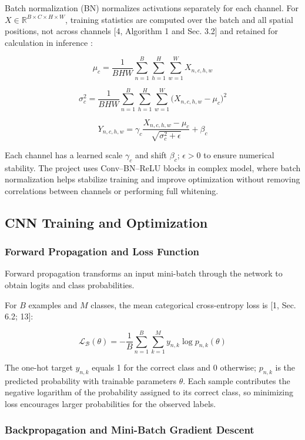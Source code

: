 Batch normalization (BN) normalizes activations separately for each channel. For \(X\in {\mathbb{R}}^{B\times C\times H\times W}\), training statistics are computed over the batch and all spatial positions, not across channels [4, Algorithm 1 and Sec. 3.2] and retained for calculation in inference :

\[
{\mu }_{c}=\frac{1}{BHW}\sum _{n=1}^{B} \sum _{h=1}^{H} \sum _{w=1}^{W} {X}_{n,c,h,w}
\]

\[
{\sigma }_{c}^{2}=\frac{1}{BHW}\sum _{n=1}^{B} \sum _{h=1}^{H} \sum _{w=1}^{W} ({X}_{n,c,h,w}-{\mu }_{c}{)}^{2}
\]

\[
{Y}_{n,c,h,w}={\gamma }_{c}\frac{{X}_{n,c,h,w}-{\mu }_{c}}{\sqrt{{\sigma }_{c}^{2}+\epsilon }}+{\beta }_{c}
\]

Each channel has a learned scale \({\gamma }_{c}\) and shift \({\beta }_{c}\); \(\epsilon >0\) to ensure numerical stability. The project uses Conv--BN--ReLU blocks in complex model, where batch normalization helps stabilize training and improve optimization without removing correlations between channels or performing full whitening.

\subsection{CNN Training and Optimization}\label{theory:2.3}

\subsubsection{Forward Propagation and Loss Function}\label{theory:2.3.1}

Forward propagation transforms an input mini-batch through the network to obtain logits and class probabilities.

For \(B\) examples and \(M\) classes, the mean categorical cross-entropy loss is [1, Sec. 6.2; 13]:

\[
{\mathcal{L}}_{\mathcal{B}}(\theta )=-\frac{1}{B}\sum _{n=1}^{B} \sum _{k=1}^{M} {y}_{n,k}\log {p}_{n,k}(\theta )
\]

The one-hot target \({y}_{n,k}\) equals 1 for the correct class and 0 otherwise; \({p}_{n,k}\) is the predicted probability with trainable parameters \(\theta .\) Each sample contributes the negative logarithm of the probability assigned to its correct class, so minimizing loss encourages larger probabilities for the observed labels.

\subsubsection{Backpropagation and Mini-Batch Gradient Descent}\label{theory:2.3.2}

